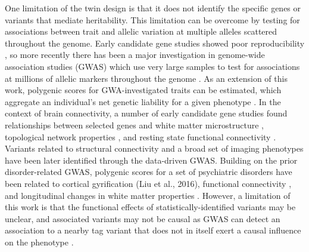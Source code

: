 One limitation of the twin design is that it does not identify the specific genes or variants that mediate heritability. This limitation can be overcome by testing for associations between trait and allelic variation at multiple alleles scattered throughout the genome. Early candidate gene studies showed poor reproducibility \citep{Hutchison2004,Sullivan2007}, so more recently there has been a major investigation in genome-wide association studies (GWAS) which use very large samples to test for associations at millions of allelic markers throughout the genome \citep{Bush2012}. As an extension of this work, polygenic scores for GWA-investigated traits can be estimated, which aggregate an individual’s net genetic liability for a given phenotype \citep{Torkamani2018}. In the context of brain connectivity, a number of early candidate gene studies found relationships between selected genes and white matter microstructure \citep{Braskie2012,Chiang2011,Jahanshad2012b}, topological network properties \citep{Dennis2011}, and resting state functional connectivity \citep{Filippini2009,Trachtenberg2012,Westlye2011}. Variants related to structural connectivity \citep{Chiang2009,Jahanshad2012a,Jahanshad2013} and a broad set of imaging phenotypes \citep{Elliott2018} have been later identified through the data-driven GWAS. Building on the prior disorder-related GWAS, polygenic scores for a set of psychiatric disorders have been related to cortical gyrification (Liu et al., 2016), functional connectivity \citep{Dezhina2018,Sadeh2018,Wang2017}, and longitudinal changes in white matter properties \citep{Alloza2018}. However, a limitation of this work is that the functional effects of statistically-identified variants may be unclear, and associated variants may not be causal as GWAS can detect an association to a nearby tag variant that does not in itself exert a causal influence on the phenotype \citep{Wang2010}.

